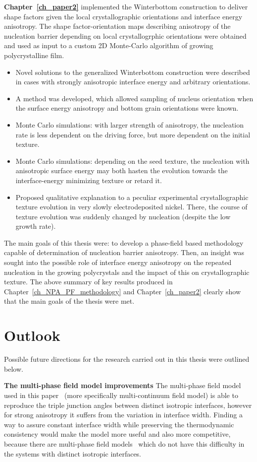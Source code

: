 \textbf{Chapter~\ref{ch_paper2}} implemented the Winterbottom construction to deliver shape factors given the local crystallographic orientations and interface energy anisotropy. The shape factor-orientation maps describing anisotropy of the nucleation barrier depending on local crystallogrphic orientations were obtained and used as input to a custom 2D Monte-Carlo algorithm of growing polycrystalline film.
\begin{itemize}
	\item Novel solutions to the generalized Winterbottom construction were described in cases with strongly anisotropic interface energy and arbitrary orientations.
	\item A method was developed, which allowed sampling of nucleus orientation when the surface energy anisotropy and bottom grain orientations were known.
	\item Monte Carlo simulations: with larger strength of anisotropy, the nucleation rate is less dependent on the driving force, but more dependent on the initial texture.
	\item Monte Carlo simulations: depending on the seed texture, the nucleation with anisotropic surface energy may both hasten the evolution towards the interface-energy minimizing texture or retard it.
	\item Proposed qualitative explanation to a peculiar experimental crystallographic texture evolution in very slowly electrodeposited nickel. There, the course of texture evolution was suddenly changed by nucleation (despite the low growth rate).
\end{itemize}

The main goals of this thesis were: to develop a phase-field based methodology capable of determination of nucleation barrier anisotropy. Then, an insight was sought into the possible role of interface energy anisotropy on the repeated nucleation in the growing polycrystals and the impact of this on crystallographic texture. The above summary of key results produced in Chapter~\ref{ch_NPA_PF_methodology} and Chapter~\ref{ch_paper2} clearly show that the main goals of the thesis were met.
	
\section{Outlook}
Possible future directions for the research carried out in this thesis were outlined below.

\textbf{The multi-phase field model improvements} The multi-phase field model used in this paper~\cite{Moelans2008, Minar2022} (more specifically multi-continuum field model) is able to reproduce the triple junction angles between distinct isotropic interfaces, however for strong anisotropy it suffers from the variation in interface width. Finding a way to assure constant interface width while preserving the thermodynamic consistency would make the model more useful and also more competitive, because there are multi-phase field models~\cite{Steinbach1999, Nestler2005} which do not have this difficulty in the systems with distinct isotropic interfaces.

